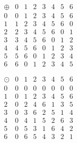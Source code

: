 \documentclass[12pt]{article}
\begin{document}
\begin{multicols}{2}
 \[
  \begin{array}{c|ccccccc}
   \oplus& 0&1&2&3&4&5&6\\
\hline
0&0&1&2&3&4&5&6\\
1&1&2&3&4&5&6&0\\
2&2&3&4&5&6&0&1\\
3&3&4&5&6&0&1&2\\
4&4&5&6&0&1&2&3\\
5&5&6&0&1&2&3&4\\
6&6&0&1&2&3&4&5
  \end{array}
 \]

\[
 \begin{array}{c|ccccccc}
  \odot&0&1&2&3&4&5&6\\
\hline
0&0&0&0&0&0&0&0\\
1&0&1&2&3&4&5&6\\
2&0&2&4&6&1&3&5\\
3&0&3&6&2&5&1&4\\
4&0&4&1&5&2&6&3\\
5&0&5&3&1&6&4&2\\
6&0&6&5&4&3&2&1
 \end{array}
\]

\end{multicols}
\end{document}
